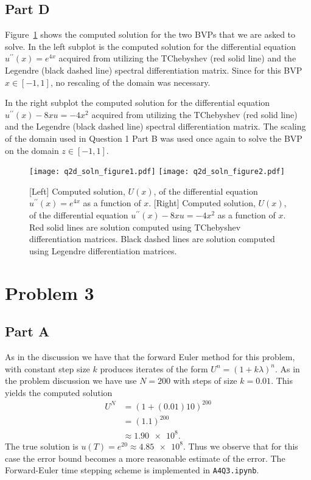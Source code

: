 \documentclass[12pt]{article}
\begin{document}
\subsection*{Part D}

Figure~\ref{fig:q2d_figure} shows the computed solution for the two BVPs that we are asked to solve. In the left subplot is the computed solution for the differential equation $u^{\prime\prime}(x) = e^{4x}$ acquired from utilizing the TChebyshev (red solid line) and the Legendre (black dashed line) spectral differentiation matrix. Since for this BVP $x\in [-1,1]$, no rescaling of the domain was necessary. 

In the right subplot the computed solution for the differential equation $u^{\prime\prime}(x) - 8xu = -4x^{2}$ acquired from utilizing the TChebyshev (red solid line) and the Legendre (black dashed line) spectral differentiation matrix. The scaling of the domain used in Question 1 Part B was used once again to solve the BVP on the domain $z\in [-1,1]$. 

\begin{figure}[!h]
	\centering
	\texttt{[image: q2d\_soln\_figure1.pdf]}
	\texttt{[image: q2d\_soln\_figure2.pdf]}
	\caption{[Left] Computed solution, $U(x)$, of the differential equation $u^{\prime\prime}(x) = e^{4x}$ as a function of $x$. [Right] Computed solution, $U(x)$, of the differential equation $u^{\prime\prime}(x) - 8xu = -4x^{2}$ as a function of $x$. Red solid lines are solution computed using TChebyshev differentiation matrices. Black dashed lines are solution computed using Legendre differentiation matrices.}
    \label{fig:q2d_figure}
\end{figure}

\section*{Problem 3}

\subsection*{Part A}
As in the discussion we have that the forward Euler method for this problem, with constant step size $k$ produces iterates of the form $U^{n} = (1+k\lambda)^{n}$. As in the problem discussion we have use $N = 200$ with steps of size $k=0.01$. This yields the computed solution 
\begin{subequations}
    \begin{align}
        U^{N} &= (1+(0.01)10)^{200}\\
        &= (1.1)^{200}\\
        &\approx \num{1.90e8}.
    \end{align}
\end{subequations}
The true solution is $u(T) = e^{20} \approx \num{4.85e8}$. Thus we observe that for this case the error bound becomes a more reasonable estimate of the error. The Forward-Euler time stepping scheme is implemented in \verb|A4Q3.ipynb|.
\end{document}
